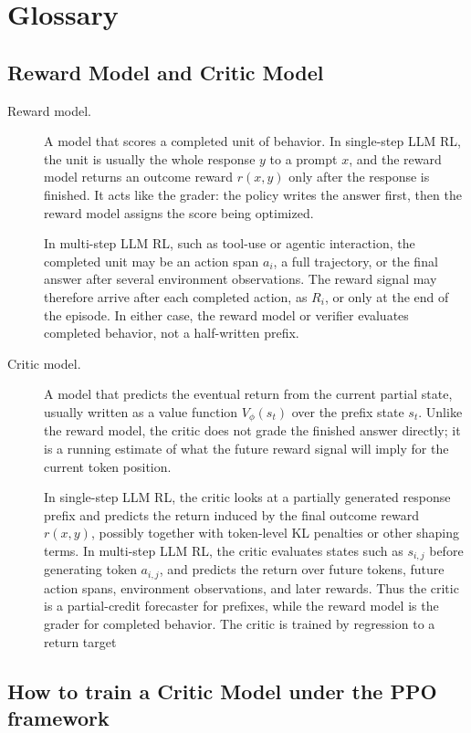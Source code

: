 \section{Glossary}

\subsection{Reward Model and Critic Model}

\begin{description}
    \item[Reward model.] A model that scores a completed unit of behavior. In single-step LLM RL, the unit is usually the whole response $y$ to a prompt $x$, and the reward model returns an outcome reward $r(x,y)$ only after the response is finished. It acts like the grader: the policy writes the answer first, then the reward model assigns the score being optimized.

    In multi-step LLM RL, such as tool-use or agentic interaction, the completed unit may be an action span $a_i$, a full trajectory, or the final answer after several environment observations. The reward signal may therefore arrive after each completed action, as $R_i$, or only at the end of the episode. In either case, the reward model or verifier evaluates completed behavior, not a half-written prefix.

    \item[Critic model.] A model that predicts the eventual return from the current partial state, usually written as a value function $V_\phi(s_t)$ over the prefix state $s_t$. Unlike the reward model, the critic does not grade the finished answer directly; it is a running estimate of what the future reward signal will imply for the current token position.

    In single-step LLM RL, the critic looks at a partially generated response prefix and predicts the return induced by the final outcome reward $r(x,y)$, possibly together with token-level KL penalties or other shaping terms. In multi-step LLM RL, the critic evaluates states such as $s_{i,j}$ before generating token $a_{i,j}$, and predicts the return over future tokens, future action spans, environment observations, and later rewards. Thus the critic is a partial-credit forecaster for prefixes, while the reward model is the grader for completed behavior. The critic is trained by regression to a return target
\end{description}

\subsection{How to train a Critic Model under the PPO framework}

